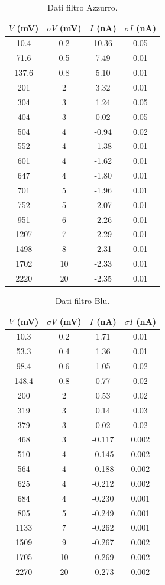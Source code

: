 \documentclass[10pt,a4paper]{article}
\begin{document}
\begin{table}[!htb]\centering
\begin{tabular}{|c|c|c|c|}
\hline
$V$ (mV) & $\sigma V$ (mV) & $I$ (nA) & $\sigma I$ (nA)\\
\hline
10.4 & 0.2 & 10.36 & 0.05\\
71.6 & 0.5 & 7.49 & 0.01\\
137.6 & 0.8 & 5.10 & 0.01\\
201 & 2 & 3.32 & 0.01\\
304 & 3 & 1.24 & 0.05\\
404 & 3 & 0.02 & 0.05\\
504 & 4 & -0.94 & 0.02\\
552 & 4 & -1.38 & 0.01\\
601 & 4 & -1.62 & 0.01\\
647 & 4 & -1.80 & 0.01\\
701 & 5 & -1.96 & 0.01\\
752 & 5 & -2.07 & 0.01\\
951 & 6 & -2.26 & 0.01\\
1207 & 7 & -2.29 & 0.01\\
1498 & 8 & -2.31 & 0.01\\
1702 & 10 & -2.33 & 0.01\\
2220 & 20 & -2.35 & 0.01\\
\hline
\end{tabular}
\caption{Dati filtro Azzurro.}
\end{table}


\begin{table}[!htb]\centering
\begin{tabular}{|c|c|c|c|}
\hline
$V$ (mV) & $\sigma V$ (mV) & $I$ (nA) & $\sigma I$ (nA)\\
\hline
10.3 & 0.2 & 1.71 & 0.01\\
53.3 & 0.4 & 1.36 & 0.01\\
98.4 & 0.6 & 1.05 & 0.02\\
148.4 & 0.8 & 0.77 & 0.02\\
200 & 2 & 0.53 & 0.02\\
319 & 3 & 0.14 & 0.03\\
379 & 3 & 0.02 & 0.02\\
468 & 3 & -0.117 & 0.002\\
510 & 4 & -0.145 & 0.002\\
564 & 4 & -0.188 & 0.002\\
625 & 4 & -0.212 & 0.002\\
684 & 4 & -0.230 & 0.001\\
805 & 5 & -0.249 & 0.001\\
1133 & 7 & -0.262 & 0.001\\
1509 & 9 & -0.267 & 0.002\\
1705 & 10 & -0.269 & 0.002\\
2270 & 20 & -0.273 & 0.002\\
\hline
\end{tabular}
\caption{Dati filtro Blu.}
\end{table}
\end{document}
